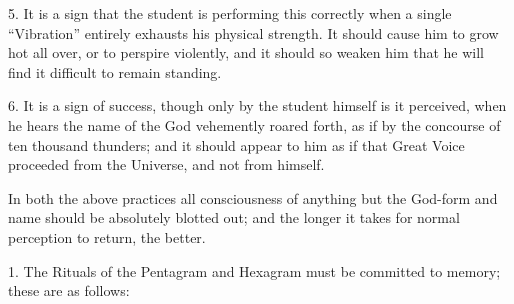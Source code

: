 5. It is a sign that the student is performing this correctly when a single \enquote{Vibration} entirely exhausts his physical strength. It should cause him to grow hot all over, or to perspire violently, and it should so weaken him that he will find it difficult to remain standing.

6. It is a sign of success, though only by the student himself is it perceived, when he hears the name of the God vehemently roared forth, as if by the concourse of ten thousand thunders; and it should appear to him as if that Great Voice proceeded from the Universe, and not from himself.

In both the above practices all consciousness of anything but the God-form and name should be absolutely blotted out; and the longer it takes for normal perception to return, the better.



1. The Rituals of the Pentagram and Hexagram must be committed to memory; these are as follows:

